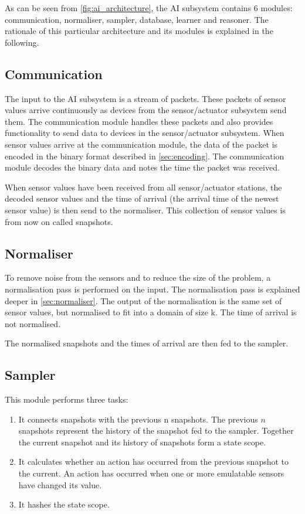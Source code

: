 As can be seen from \cref{fig:ai_architecture}, the AI subsystem contains 6 modules: communication, normaliser, sampler, database, learner and reasoner. The rationale of this particular architecture and its modules is explained in the following.

\subsection{Communication}
The input to the AI subsystem is a stream of packets. These packets of sensor values arrive continuously as devices from the sensor/actuator subsystem send them. The communication module handles these packets and also provides functionality to send data to devices in the sensor/actuator subsystem. When sensor values arrive at the communication module, the data of the packet is encoded in the binary format described in \cref{sec:encoding}. The communication module decodes the binary data and notes the time the packet was received.

When sensor values have been received from all sensor/actuator stations, the decoded sensor values and the time of arrival (the arrival time of the newest sensor value) is then send to the normaliser. This collection of sensor values is from now on called snapshots.

\subsection{Normaliser}
To remove noise from the sensors and to reduce the size of the problem, a normalisation pass is performed on the input. The normalisation pass is explained deeper in \cref{sec:normaliser}. The output of the normalisation is the same set of sensor values, but normalised to fit into a domain of size k. The time of arrival is not normalised.

The normalised snapshots and the times of arrival are then fed to the sampler.

\subsection{Sampler}
This module performs three tasks:

\begin{enumerate}
\item It connects snapshots with the previous n snapshots. The previous $n$ snapshots represent the history of the snapshot fed to the sampler. Together the current snapshot and its history of snapshots form a state scope.
\item It calculates whether an action has occurred from the previous snapshot to the current. An action has occurred when one or more emulatable sensors have changed its value.
\item It hashes the state scope.
\end{enumerate}

